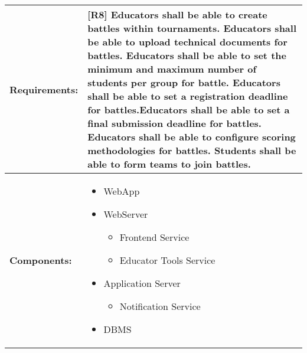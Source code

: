 \begin{table}[!ht]
    \centering
    {\renewcommand{\arraystretch}{2} %
    \setlength{\tabcolsep}{0.5em} %
    \begin{tabularx}{\textwidth}{|l|X|}
    \hline
       \textbf{Requirements:} & [R8] Educators shall be able to create battles within tournaments. \newline
       [R9] Educators shall be able to upload technical documents for battles. \newline 
       [R10] Educators shall be able to set the minimum and maximum number of students per group for battle. \newline
       [R11] Educators shall be able to set a registration deadline for battles.\newline
       [R12] Educators shall be able to set a final submission deadline for battles. \newline
       [R13] Educators shall be able to configure scoring methodologies for battles. \newline
       [R14] Students shall be able to form teams to join battles.
       \\ \hline
        \textbf{Components:} & 
        \begin{minipage} [t] {0.4\textwidth} 
      \begin{itemize}
      \item WebApp
      \item WebServer
        \begin{itemize}
            \item Frontend Service
            \item Educator Tools Service
        \end{itemize}
      \item Application Server
        \begin{itemize}
            \item Notification Service
        \end{itemize}
      \item DBMS
     \end{itemize} 
    \end{minipage} \\ [2pt]  \hline
    \end{tabularx}} \quad
\end{table}

